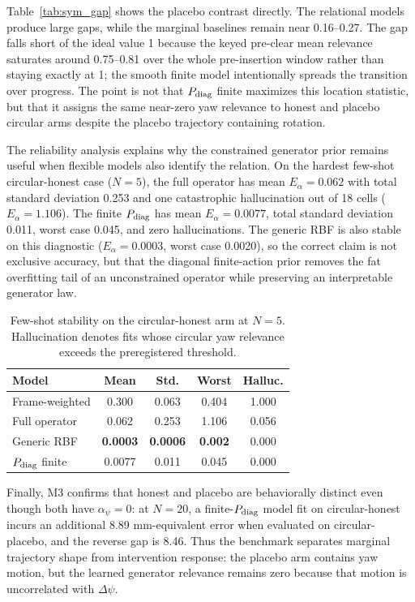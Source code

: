 \documentclass[letterpaper,10pt,conference]{ieeeconf}
\begin{document}
Table~\ref{tab:sym_gap} shows the placebo contrast directly. The relational
models produce large gaps, while the marginal baselines remain near 0.16--0.27.
The gap falls short of the ideal value 1 because the keyed pre-clear mean
relevance saturates around 0.75--0.81 over the whole pre-insertion window rather
than staying exactly at 1; the smooth finite model intentionally spreads the
transition over progress. The point is not that $P_{\rm diag}$ finite maximizes
this location statistic, but that it assigns the same near-zero yaw relevance
to honest and placebo circular arms despite the placebo trajectory containing
rotation.

The reliability analysis explains why the constrained generator prior remains
useful when flexible models also identify the relation. On the hardest
few-shot circular-honest case ($N=5$), the full operator has mean
$E_\alpha=0.062$ with total standard deviation 0.253 and one catastrophic
hallucination out of 18 cells ($E_\alpha=1.106$). The finite $P_{\rm diag}$
has mean $E_\alpha=0.0077$, total standard deviation 0.011, worst case 0.045,
and zero hallucinations. The generic RBF is also stable on this diagnostic
($E_\alpha=0.0003$, worst case 0.0020), so the correct claim is not exclusive
accuracy, but that the diagonal finite-action prior removes the fat overfitting
tail of an unconstrained operator while preserving an interpretable generator
law.

\begin{table}[t]
\centering
\caption{Few-shot stability on the circular-honest arm at $N=5$. Hallucination
denotes fits whose circular yaw relevance exceeds the preregistered threshold.}
\label{tab:sym_var}
\small
\setlength{\tabcolsep}{4.0pt}
\begin{tabular}{lcccc}
\toprule
Model & Mean & Std. & Worst & Halluc.\\
\midrule
Frame-weighted & 0.300 & 0.063 & 0.404 & 1.000\\
Full operator & 0.062 & 0.253 & 1.106 & 0.056\\
Generic RBF & \textbf{0.0003} & \textbf{0.0006} & \textbf{0.002} & 0.000\\
$P_{\rm diag}$ finite & 0.0077 & 0.011 & 0.045 & 0.000\\
\bottomrule
\end{tabular}
\end{table}

Finally, M3 confirms that honest and placebo are behaviorally distinct even
though both have $\alpha_\psi=0$: at $N=20$, a finite-$P_{\rm diag}$ model fit
on circular-honest incurs an additional 8.89 mm-equivalent error when evaluated
on circular-placebo, and the reverse gap is 8.46. Thus the benchmark separates
marginal trajectory shape from intervention response: the placebo arm contains
yaw motion, but the learned generator relevance remains zero because that
motion is uncorrelated with $\Delta\psi$.
\end{document}
